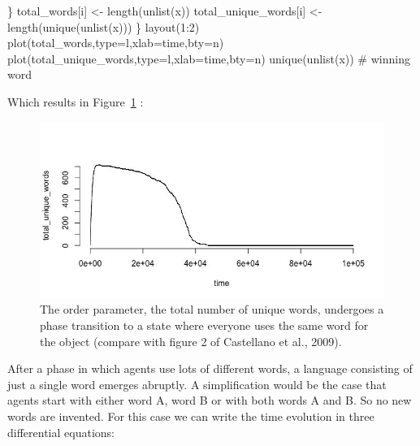 \documentclass[
  letterpaper,
]{scrbook}
\newenvironment{Shaded}{\begin{snugshade}}{\end{snugshade}}
\newcommand{\AttributeTok}[1]{\textcolor[rgb]{0.40,0.45,0.13}{#1}}
\newcommand{\CommentTok}[1]{\textcolor[rgb]{0.37,0.37,0.37}{#1}}
\newcommand{\DecValTok}[1]{\textcolor[rgb]{0.68,0.00,0.00}{#1}}
\newcommand{\FunctionTok}[1]{\textcolor[rgb]{0.28,0.35,0.67}{#1}}
\newcommand{\NormalTok}[1]{\textcolor[rgb]{0.00,0.23,0.31}{#1}}
\newcommand{\OtherTok}[1]{\textcolor[rgb]{0.00,0.23,0.31}{#1}}
\newcommand{\SpecialCharTok}[1]{\textcolor[rgb]{0.37,0.37,0.37}{#1}}
\newcommand{\StringTok}[1]{\textcolor[rgb]{0.13,0.47,0.30}{#1}}
\begin{document}
\begin{Shaded}
\begin{Highlighting}[]
\NormalTok{  \} }
\NormalTok{  total\_words[i] }\OtherTok{\textless{}{-}} \FunctionTok{length}\NormalTok{(}\FunctionTok{unlist}\NormalTok{(x))}
\NormalTok{  total\_unique\_words[i] }\OtherTok{\textless{}{-}} \FunctionTok{length}\NormalTok{(}\FunctionTok{unique}\NormalTok{(}\FunctionTok{unlist}\NormalTok{(x)))}
\NormalTok{\}}
\FunctionTok{layout}\NormalTok{(}\DecValTok{1}\SpecialCharTok{:}\DecValTok{2}\NormalTok{)}
\FunctionTok{plot}\NormalTok{(total\_words,}\AttributeTok{type=}\StringTok{\textquotesingle{}l\textquotesingle{}}\NormalTok{,}\AttributeTok{xlab=}\StringTok{\textquotesingle{}time\textquotesingle{}}\NormalTok{,}\AttributeTok{bty=}\StringTok{\textquotesingle{}n\textquotesingle{}}\NormalTok{)}
\FunctionTok{plot}\NormalTok{(total\_unique\_words,}\AttributeTok{type=}\StringTok{\textquotesingle{}l\textquotesingle{}}\NormalTok{,}\AttributeTok{xlab=}\StringTok{\textquotesingle{}time\textquotesingle{}}\NormalTok{,}\AttributeTok{bty=}\StringTok{\textquotesingle{}n\textquotesingle{}}\NormalTok{)}
\FunctionTok{unique}\NormalTok{(}\FunctionTok{unlist}\NormalTok{(x)) }\CommentTok{\# winning word}
\end{Highlighting}
\end{Shaded}

Which results in Figure~\ref{fig-ch7-img3-old-91} :

\begin{figure}

{\centering \includegraphics[width=4.70833in,height=\textheight]{media/ch7/image3.jpg}

}

\caption{\label{fig-ch7-img3-old-91}The order parameter, the total
number of unique words, undergoes a phase transition to a state where
everyone uses the same word for the object (compare with figure 2 of
Castellano et al., 2009).}

\end{figure}

After a phase in which agents use lots of different words, a language
consisting of just a single word emerges abruptly. A simplification
would be the case that agents start with either word A, word B or with
both words A and B. So no new words are invented. For this case we can
write the time evolution in three differential equations:
\end{document}
